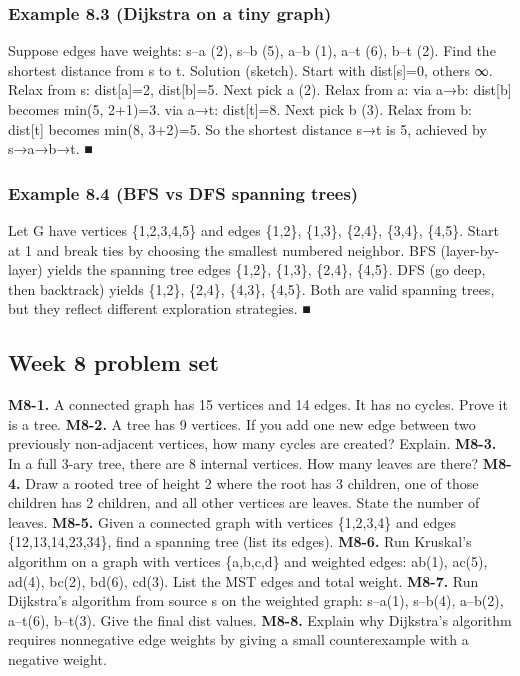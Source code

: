 \documentclass[11pt]{article}
\begin{document}
\subsubsection*{Example 8.3 (Dijkstra on a tiny graph)}
Suppose edges have weights: s–a (2), s–b (5), a–b (1), a–t (6), b–t (2). Find the
shortest distance from s to t.
Solution (sketch). Start with dist[s]=0, others ∞.
Relax from s: dist[a]=2, dist[b]=5. Next pick a (2). Relax from a:
via a→b: dist[b] becomes min(5, 2+1)=3. via a→t: dist[t]=8.
Next pick b (3). Relax from b: dist[t] becomes min(8, 3+2)=5.
So the shortest distance s→t is 5, achieved by s→a→b→t. ■
\subsubsection*{Example 8.4 (BFS vs DFS spanning trees)}
Let G have vertices \{1,2,3,4,5\} and edges \{1,2\}, \{1,3\}, \{2,4\}, \{3,4\}, \{4,5\}.
Start at 1 and break ties by choosing the smallest numbered neighbor.
BFS (layer-by-layer) yields the spanning tree edges \{1,2\}, \{1,3\}, \{2,4\}, \{4,5\}.
DFS (go deep, then backtrack) yields \{1,2\}, \{2,4\}, \{4,3\}, \{4,5\}.
Both are valid spanning trees, but they reflect different exploration strategies. ■
\subsection*{Week 8 problem set}
\textbf{M8-1.} A connected graph has 15 vertices and 14 edges. It has no cycles. Prove it is a
tree.
\textbf{M8-2.} A tree has 9 vertices. If you add one new edge between two previously
non-adjacent vertices, how many cycles are created? Explain.
\textbf{M8-3.} In a full 3-ary tree, there are 8 internal vertices. How many leaves are there?
\textbf{M8-4.} Draw a rooted tree of height 2 where the root has 3 children, one of those
children has 2 children, and all other vertices are leaves. State the number of leaves.
\textbf{M8-5.} Given a connected graph with vertices \{1,2,3,4\} and edges \{12,13,14,23,34\},
find a spanning tree (list its edges).
\textbf{M8-6.} Run Kruskal’s algorithm on a graph with vertices \{a,b,c,d\} and weighted edges:
ab(1), ac(5), ad(4), bc(2), bd(6), cd(3). List the MST edges and total weight.
\textbf{M8-7.} Run Dijkstra’s algorithm from source s on the weighted graph: s–a(1), s–b(4),
a–b(2), a–t(6), b–t(3). Give the final dist values.
\textbf{M8-8.} Explain why Dijkstra’s algorithm requires nonnegative edge weights by giving a
small counterexample with a negative weight.

\clearpage
\end{document}

